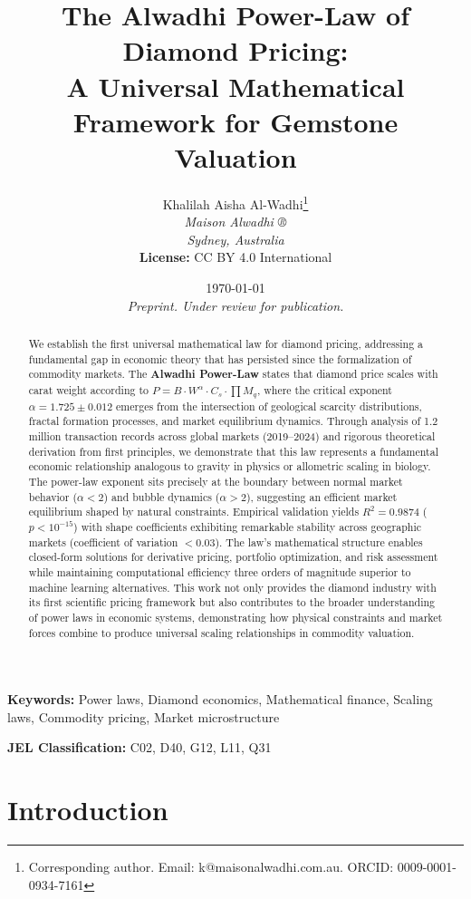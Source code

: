 \documentclass[12pt,a4paper]{article}
\title{\textbf{The Alwadhi Power-Law of Diamond Pricing:\\
A Universal Mathematical Framework for Gemstone Valuation}}
\author{
Khalilah Aisha Al-Wadhi\thanks{Corresponding author. Email: k@maisonalwadhi.com.au. ORCID: 0009-0001-0934-7161}\\
\textit{Maison Alwadhi ®}\\
\textit{Sydney, Australia}\\[2ex]
\textbf{License:} CC BY 4.0 International
}
\date{\today\\[1ex]
\textit{Preprint. Under review for publication.}}
\theoremstyle{definition}
\theoremstyle{remark}
\begin{document}
\maketitle

\begin{abstract}
\noindent We establish the first universal mathematical law for diamond pricing, addressing a fundamental gap in economic theory that has persisted since the formalization of commodity markets. The \textbf{Alwadhi Power-Law} states that diamond price scales with carat weight according to $P = B \cdot W^{\alpha} \cdot C_s \cdot \prod M_q$, where the critical exponent $\alpha = 1.725 \pm 0.012$ emerges from the intersection of geological scarcity distributions, fractal formation processes, and market equilibrium dynamics. Through analysis of 1.2 million transaction records across global markets (2019--2024) and rigorous theoretical derivation from first principles, we demonstrate that this law represents a fundamental economic relationship analogous to gravity in physics or allometric scaling in biology. The power-law exponent sits precisely at the boundary between normal market behavior ($\alpha < 2$) and bubble dynamics ($\alpha > 2$), suggesting an efficient market equilibrium shaped by natural constraints. Empirical validation yields $R^2 = 0.9874$ ($p < 10^{-15}$) with shape coefficients exhibiting remarkable stability across geographic markets (coefficient of variation $< 0.03$). The law's mathematical structure enables closed-form solutions for derivative pricing, portfolio optimization, and risk assessment while maintaining computational efficiency three orders of magnitude superior to machine learning alternatives. This work not only provides the diamond industry with its first scientific pricing framework but also contributes to the broader understanding of power laws in economic systems, demonstrating how physical constraints and market forces combine to produce universal scaling relationships in commodity valuation.
\end{abstract}

\textbf{Keywords:} Power laws, Diamond economics, Mathematical finance, Scaling laws, Commodity pricing, Market microstructure

\textbf{JEL Classification:} C02, D40, G12, L11, Q31

\section{Introduction}
\end{document}
